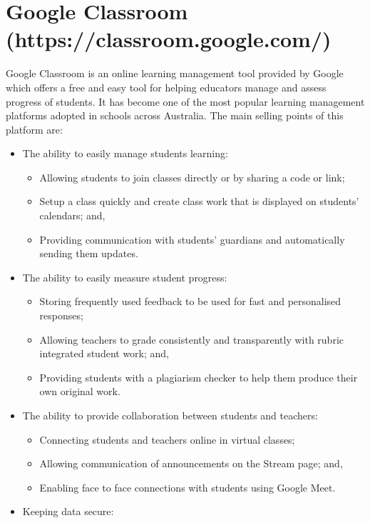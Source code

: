 \section{Google Classroom (https://classroom.google.com/)}
Google Classroom is an online learning management tool provided by Google which offers a free and easy tool for helping educators manage and assess progress of students. It has become one of the most popular learning management platforms adopted in schools across Australia. 
The main selling points of this platform are:
\begin{itemize}
    \item The ability to easily manage students learning:
    \begin{itemize}
        \item Allowing students to join classes directly or by sharing a code or link;
        \item Setup a class quickly and create class work that is displayed on students’ calendars; and, 
        \item Providing communication with students’ guardians and automatically sending them updates.
    \end{itemize}
    \item The ability to easily measure student progress:
    \begin{itemize}
        \item Storing frequently used feedback to be used for fast and personalised responses;
        \item Allowing teachers to grade consistently and transparently with rubric integrated student work; and,
        \item Providing students with a plagiarism checker to help them produce their own original work.
    \end{itemize}
    \item The ability to provide collaboration between students and teachers:
    \begin{itemize}
        \item Connecting students and teachers online in virtual classes;
        \item Allowing communication of announcements on the Stream page; and,
        \item Enabling face to face connections with students using Google Meet.
    \end{itemize}
    \item Keeping data secure: 
    \begin{itemize}

\end{itemize}
\end{itemize}
